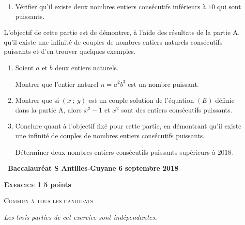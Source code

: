 \documentclass[10pt,a4paper]{article}
\begin{document}
\medskip

\begin{enumerate}
\item Vérifier qu'il existe deux nombres entiers consécutifs inférieurs à $10$ qui sont puissants.
\end{enumerate}
\medskip

L'objectif de cette partie est de démontrer, à l'aide des résultats de la partie A, qu'il existe une infinité de couples de nombres entiers naturels consécutifs puissants et d'en trouver quelques exemples.

\medskip

\begin{enumerate}[resume]
\item  Soient $a$ et $b$ deux entiers naturels.

Montrer que l'entier naturel $n = a^2 b^3$ est un nombre puissant.
\item  Montrer que si $(x~;~y)$ est un couple solution de l'équation $(E)$ définie dans la partie A, alors $x^2 - 1$ et $x^2$ sont des entiers consécutifs puissants.
\item  Conclure quant à l'objectif fixé pour cette partie, en démontrant qu'il existe une infinité de couples de nombres entiers consécutifs puissants.

Déterminer deux nombres entiers consécutifs puissants supérieurs à $2018$.
\end{enumerate}
\newpage
\hypertarget{Antillessep}{}

\label{Antillessep}

\pagestyle{fancy}
\thispagestyle{empty} 
\begin{center}
{\Large\textbf{\decofourleft~Baccalauréat S Antilles-Guyane 6 septembre 2018 
~\decofourright}}
\end{center}

\def\labelitemi{$\bullet$}

\vspace{0,5cm}

\textbf{\textsc{Exercice 1} \hfill 5 points}

\textsc{Commun à tous les candidats}

\bigskip

\emph{Les trois parties de cet exercice sont indépendantes.}

\medskip
\end{document}
